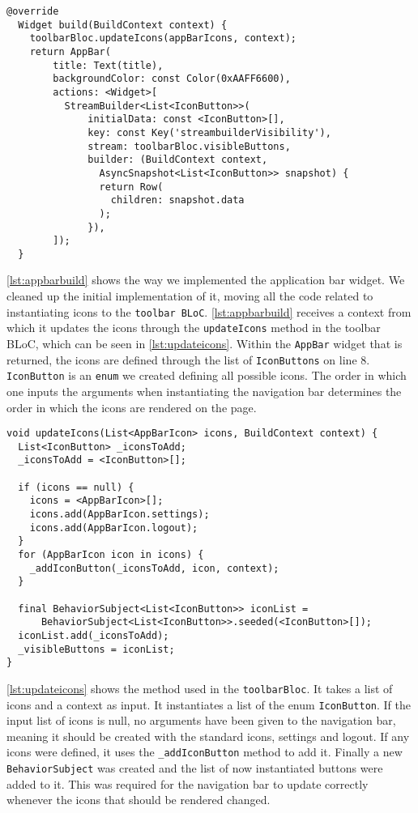 \begin{lstlisting}[caption={Building the appbar},label={lst:appbarbuild},language={[Sharp]C}]
  @override
  Widget build(BuildContext context) {
    toolbarBloc.updateIcons(appBarIcons, context);
    return AppBar(
        title: Text(title),
        backgroundColor: const Color(0xAAFF6600),
        actions: <Widget>[
          StreamBuilder<List<IconButton>>(
              initialData: const <IconButton>[],
              key: const Key('streambuilderVisibility'),
              stream: toolbarBloc.visibleButtons,
              builder: (BuildContext context, 
                AsyncSnapshot<List<IconButton>> snapshot) {
                return Row(
                  children: snapshot.data
                );
              }),
        ]);
  }
\end{lstlisting}
\autoref{lst:appbarbuild} shows the way we implemented the application bar widget.
We cleaned up the initial implementation of it, moving all the code related to instantiating icons to the \texttt{toolbar BLoC}.
\autoref{lst:appbarbuild} receives a context from which it updates the icons through the \texttt{updateIcons} method in the toolbar BLoC, which can be seen in \autoref{lst:updateicons}.
Within the \texttt{AppBar} widget that is returned, the icons are defined through the list of \texttt{IconButtons} on line 8.
\texttt{IconButton} is an \texttt{enum} we created defining all possible icons.
The order in which one inputs the arguments when instantiating the navigation bar determines the order in which the icons are rendered on the page. 

\begin{lstlisting}[caption={Updating the icons in the appbar},label={lst:updateicons},language={[Sharp]C}]
  void updateIcons(List<AppBarIcon> icons, BuildContext context) {
  List<IconButton> _iconsToAdd;
  _iconsToAdd = <IconButton>[];

  if (icons == null) {
    icons = <AppBarIcon>[];
    icons.add(AppBarIcon.settings);
    icons.add(AppBarIcon.logout);
  }
  for (AppBarIcon icon in icons) {
    _addIconButton(_iconsToAdd, icon, context);
  }

  final BehaviorSubject<List<IconButton>> iconList =
      BehaviorSubject<List<IconButton>>.seeded(<IconButton>[]);
  iconList.add(_iconsToAdd);
  _visibleButtons = iconList;
}
\end{lstlisting}
\autoref{lst:updateicons} shows the method used in the \texttt{toolbarBloc}.
It takes a list of icons and a context as input.
It instantiates a list of the enum \texttt{IconButton}.
If the input list of icons is null, no arguments have been given to the navigation bar, meaning it should be created with the standard icons, settings and logout.
If any icons were defined, it uses the \texttt{\_addIconButton} method to add it.
Finally a new \texttt{BehaviorSubject} was created and the list of now instantiated buttons were added to it.
This was required for the navigation bar to update correctly whenever the icons that should be rendered changed.

